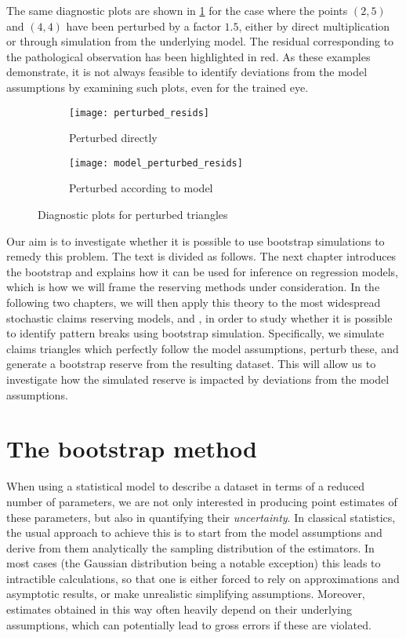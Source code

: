 \documentclass[a4paper]{book}
\begin{document}
The same diagnostic plots are shown in \cref{fig:diag-plot-perturbed} for the case where the points $(2, 5)$ and $(4, 4)$ have been perturbed by a factor $1.5$, either by direct multiplication or through simulation from the underlying model. The residual corresponding to the pathological observation has been highlighted in red. As these examples demonstrate, it is not always feasible to identify deviations from the model assumptions by examining such plots, even for the trained eye.

\begin{figure}[!htb]
  \centering
  \begin{subfigure}{\textwidth}
    \texttt{[image: perturbed\_resids]}
    \caption{Perturbed directly}
  \end{subfigure}
  \begin{subfigure}{\textwidth}
    \texttt{[image: model\_perturbed\_resids]}
    \caption{Perturbed according to model}
  \end{subfigure}
  \caption{Diagnostic plots for perturbed triangles}
  \label{fig:diag-plot-perturbed}
\end{figure}

Our aim is to investigate whether it is possible to use bootstrap simulations to remedy this problem. The text is divided as follows. The next chapter introduces the bootstrap and explains how it can be used for inference on regression models, which is how we will frame the reserving methods under consideration. In the following two chapters, we will then apply this theory to the most widespread stochastic claims reserving models,  and , in order to study whether it is possible to identify pattern breaks using bootstrap simulation. Specifically, we simulate claims triangles which perfectly follow the model assumptions, perturb these, and generate a bootstrap reserve from the resulting dataset. This will allow us to investigate how the simulated reserve is impacted by deviations from the model assumptions.

\mainmatter%

\chapter{The bootstrap method} \label{chapter:boot}

When using a statistical model to describe a dataset in terms of a reduced number of parameters, we are not only interested in producing point estimates of these parameters, but also in quantifying their \emph{uncertainty}. In classical statistics, the usual approach to achieve this is to start from the model assumptions and derive from them analytically the sampling distribution of the estimators. In most cases (the Gaussian distribution being a notable exception) this leads to intractible calculations, so that one is either forced to rely on approximations and asymptotic results, or make unrealistic simplifying assumptions. Moreover, estimates obtained in this way often heavily depend on their underlying assumptions, which can potentially lead to gross errors if these are violated.
\end{document}
